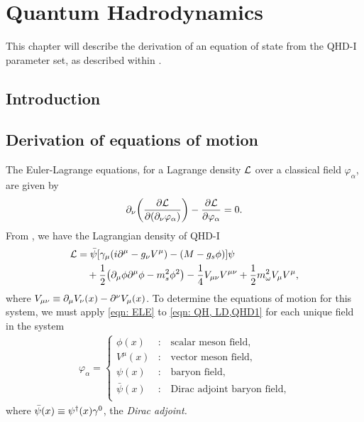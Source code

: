 \chapter{Quantum Hadrodynamics}

This chapter will describe the derivation of an equation of state from the QHD-I parameter set, as described within \autocite{diener_2008}.

\section{Introduction}


\section{Derivation of equations of motion}

The Euler-Lagrange equations, for a Lagrange density $\mathcal{L}$ over a classical field $\varphi_\alpha$, are given by
\begin{align}\label{eqn: ELE}
    \partial_\nu\qty(\pdv{\mathcal{L}}{(\partial_\nu \varphi_\alpha)}) - \pdv{\mathcal{L}}{\varphi_\alpha} = 0.
\end{align}
From \autocite[p. 56]{diener_2008}, we have the Lagrangian density of QHD-I
\begin{align} \label{eqn: QH, LD,QHD1}
    \Lag & = \bar{\psi} \bqty{\gamma_\mu(i\p^\mu -g_\nu V^\mu) - (M-g_s\phi)} \psi \nonumber\\
    & \quad + \frac{1}{2} \pqty{\p_\mu \phi \p^\mu \phi - m_s^2 \phi^2} - \frac{1}{4} V_{\mu\nu}V^{\mu\nu} + \frac{1}{2} m_\omega^2 V_\mu V^\mu,
\end{align}
where $V_{\mu\nu}\equiv\partial_\mu V_\nu (x) - \partial^\nu V_\mu(x)$. To determine the equations of motion for this system, we must apply \eqref{eqn: ELE} to \eqref{eqn: QH, LD,QHD1} for each unique field in the system
\begin{align*}
    \varphi_\alpha = \begin{cases}
        \phi(x) &: \quad \text{scalar meson field,}\\
        V^\mu(x) &: \quad \text{vector meson field,}\\
        \psi(x) &: \quad \text{baryon field,}\\
        \bar\psi(x) &: \quad \text{Dirac adjoint baryon field,}\\
    \end{cases}
\end{align*}
where $\bar\psi(x) \equiv \psi^\dagger(x)\gamma^0$, the \emph{Dirac adjoint.}

